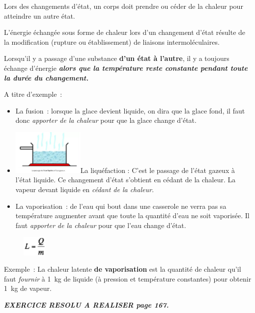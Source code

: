 Lors des changements d'état, un corps doit prendre ou céder de la
chaleur pour atteindre un autre état.

L'énergie échangée sous forme de chaleur lors d'un changement d'état
résulte de la modification (rupture ou établissement) de liaisons
intermoléculaires.

Lorsqu'il y a passage d'une substance \textbf{d'un état à l'autre}, il y
a toujours échange d'énergie \emph{\textbf{alors que la température
reste constante pendant toute la durée du changement. }}

A titre d'exemple~:

\begin{itemize}
\tightlist
\item
  La fusion~: lorsque la glace devient liquide, on dira que la glace
  fond, il faut donc \emph{apporter de la chaleur} pour que la glace
  change d'état.
\item
  \includegraphics[width=3.491cm,height=2.191cm]{Pictures/10000001000002170000015016F56C8D283134A7.png}La
  liquéfaction : C'est le passage de l'état gazeux à l'état liquide. Ce
  changement d'état s'obtient en cédant de la chaleur. La vapeur devant
  liquide en \emph{cédant de la chaleur.}
\item
  La vaporisation~: de l'eau qui bout dans une casserole ne verra pas sa
  température augmenter avant que toute la quantité d'eau ne soit
  vaporisée. Il faut \emph{apporter de la chaleur} pour que l'eau change
  d'état.
\end{itemize}

\begin{figure}
\centering
\includegraphics[width=1.177cm,height=0.989cm]{Pictures/10000001000000210000001C2230AC93944A1880.png}
\caption{}
\end{figure}

Exemple~: La chaleur latente\textbf{ de vaporisation} est la quantité de
chaleur qu'il faut \emph{fournir} à 1~kg de liquide (à pression et
température constantes) pour obtenir 1~kg de vapeur.

\emph{\textbf{EXERCICE RESOLU A REALISER page 167. }}

